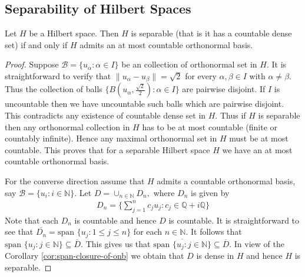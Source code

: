 \subsection{Separability of Hilbert Spaces}
\begin{proposition}
Let $H$ be a Hilbert space. Then $H$ is separable (that is it has a countable dense set) if and only if $H$ admits an at most countable orthonormal basis. 
\label{prop:separable-hilbert-spaces}
\end{proposition}
\begin{proof}
Suppose $\mathcal B = \{u_{\alpha} : \alpha \in I\}$ be an collection of orthonormal set in $H.$ It is straightforward to verify that $\|u_{\alpha}-u_{\beta}\|= \sqrt{2}$ for every $\alpha,\beta\in I$ with $\alpha \neq \beta.$ Thus  the collection of balls $\{B(u_{\alpha},\frac{\sqrt{2}}{2}) : \alpha \in I\}$ are pairwise disjoint. If $I$ is uncountable then we have uncountable such balls  which are pairwise disjoint. This contradicts any existence of countable dense set in $H.$ Thus if $H$ is separable then any orthonormal collection in $H$ has to be at most countable (finite or countably infinite). Hence any maximal orthonormal set in $H$ must be at most countable. This proves that for a separable Hilbert space $H$ we have an at most countable orthonormal basis.

For the converse direction assume that $H$ admits a countable orthonormal basis, say $\mathcal B = \{u_{i} : i \in \mathbb N\}.$ Let $D = \cup_{n\in\mathbb N} D_n,$ where $D_n$ is given by
\begin{align*}
D_n= \Big\{ \sum\limits_{j=1}^n c_j u_j : c_j \in \mathbb Q + i \mathbb Q \Big\}
\end{align*}
Note that each $D_n$ is countable and hence $D$ is countable. It is  straightforward to see that $\overline{D_n} = \text{span } \{u_j : 1\leqslant j \leqslant n\}$ for each $n\in\mathbb N.$ It follows that $\text{span } \{u_j : j\in \mathbb N\} \subseteq \overline{D}.$ This gives us that $\overline{\text{span } \{u_j : j\in \mathbb N\}} \subseteq \overline{D}.$ In view of the Corollary \ref{cor:span-closure-of-onb} we obtain that $D$ is dense in $H$ and hence $H$ is separable.
\end{proof}


